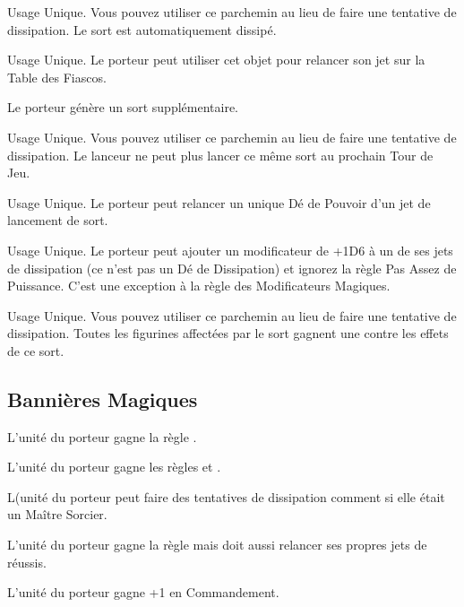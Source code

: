 Usage Unique. Vous pouvez utiliser ce parchemin au lieu de faire une tentative de dissipation. Le sort est automatiquement dissipé.

Usage Unique. Le porteur peut utiliser cet objet pour relancer son jet sur la Table des Fiascos.

Le porteur génère un sort supplémentaire.

Usage Unique. Vous pouvez utiliser ce parchemin au lieu de faire une tentative de dissipation. Le lanceur ne peut plus lancer ce même sort au prochain Tour de Jeu.

Usage Unique. Le porteur peut relancer un unique Dé de Pouvoir d'un jet de lancement de sort.

Usage Unique. Le porteur peut ajouter un modificateur de +1D6 à un de ses jets de dissipation (ce n'est pas un Dé de Dissipation) et ignorez la règle Pas Assez de Puissance. C'est une exception à la règle des Modificateurs Magiques.

Usage Unique. Vous pouvez utiliser ce parchemin au lieu de faire une tentative de dissipation. Toutes les figurines affectées par le sort gagnent une  contre les effets de ce sort.

\endpricelist

\newpage
\subsection{Bannières Magiques}

\startpricelist

L'unité du porteur gagne la règle .

L'unité du porteur gagne les règles \swiftstride{} et \strider{}.

L(unité du porteur peut faire des tentatives de dissipation comment si elle était un Maître Sorcier.

L'unité du porteur gagne la règle \divineattacks{} mais doit aussi relancer ses propres jets de \wardsave{} réussis.

L'unité du porteur gagne +1 en Commandement.

